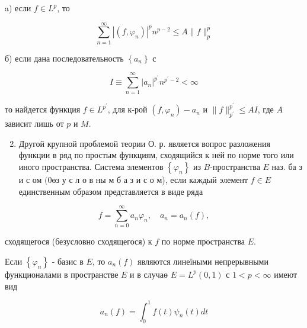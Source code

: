 \documentclass[10pt]{article}
\begin{document}
a) если $f \in L^{p}$, то



\[

\sum_{n=1}^{\infty}\left|\left(f, \varphi_{n}\right)\right|^{p} n^{p-2} \leqslant A\|f\|_{p}^{p}

\]



б) если дана последовательность $\left\{a_{n}\right\}$ с



\[

I \equiv \sum_{n=1}^{\infty}\left|a_{n}\right|^{p^{\prime}} n^{p^{\prime}-2}<\infty

\]



то найдется функция $f \in L^{p^{\prime}}$, для к-рой $\left(f, \varphi_{n}\right)-a_{n}$ и $\|f\|_{p^{\prime}}^{p^{\prime}} \leqslant A I$, где $A$ зависит лишь от $p$ и $M$.



\begin{enumerate}

  \setcounter{enumi}{1}

  \item Другой крупной проблемой теории О. р. является вопрос разложения функции в ряд по простым функциям, сходящийся к ней по норме того или иного пространства. Система элементов $\left\{\varphi_{n}\right\}$ из $B$-пространства $E$ наз. ба з и с ом $(0 ө з$ у с л о в ны м б а з и с о м), если каждый элемент $f \in E$ единственным образом представляется в виде ряда

\end{enumerate}



\[

f=\sum_{n=0}^{\infty} a_{n} \varphi_{n}, \quad a_{n}=a_{n}(f),

\]



сходящегося (безусловно сходящегося) к $f$ по норме пространства $E$.



Если $\left\{\varphi_{n}\right\}$ - базис в $E$, то $a_{n}(f)$ являются линеїными непрерывными функционалами в пространстве $E$ и в случаө $E=L^{p}(0,1)$ с $1<p<\infty$ имеют вид



\[

a_{n}(f)=\int_{0}^{1} f(t) \psi_{n}(t) d t

\]
\end{document}
